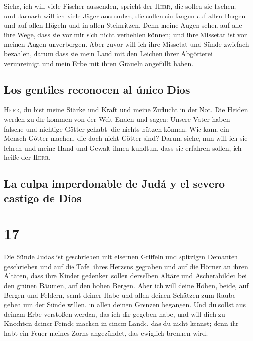  Siehe, ich will viele Fischer aussenden, spricht der
\textsc{Herr}, die sollen sie fischen; und darnach will ich viele Jäger
aussenden, die sollen sie fangen auf allen Bergen und auf allen Hügeln
und in allen Steinritzen.  Denn meine Augen sehen auf
alle ihre Wege, dass sie vor mir sich nicht verhehlen können; und ihre
Missetat ist vor meinen Augen unverborgen.  Aber zuvor
will ich ihre Missetat und Sünde zwiefach bezahlen, darum dass sie mein
Land mit den Leichen ihrer Abgötterei verunreinigt und mein Erbe mit
ihren Gräueln angefüllt haben.

\hypertarget{los-gentiles-reconocen-al-uxfanico-dios}{%
\subsection{Los gentiles reconocen al único
Dios}\label{los-gentiles-reconocen-al-uxfanico-dios}}

 \textsc{Herr}, du bist meine Stärke und Kraft und meine
Zuflucht in der Not. Die Heiden werden zu dir kommen von der Welt Enden
und sagen: Unsere Väter haben falsche und nichtige Götter gehabt, die
nichts nützen können.  Wie kann ein Mensch Götter machen,
die doch nicht Götter sind?  Darum siehe, nun will ich
sie lehren und meine Hand und Gewalt ihnen kundtun, dass sie erfahren
sollen, ich heiße der \textsc{Herr}.

\hypertarget{la-culpa-imperdonable-de-juduxe1-y-el-severo-castigo-de-dios}{%
\subsection{La culpa imperdonable de Judá y el severo castigo de
Dios}\label{la-culpa-imperdonable-de-juduxe1-y-el-severo-castigo-de-dios}}

\hypertarget{section-16}{%
\section{17}\label{section-16}}

 Die Sünde Judas ist geschrieben mit eisernen Griffeln und
spitzigen Demanten geschrieben und auf die Tafel ihres Herzens gegraben
und auf die Hörner an ihren Altären,  dass ihre Kinder
gedenken sollen derselben Altäre und Ascherabilder bei den grünen
Bäumen, auf den hohen Bergen.  Aber ich will deine Höhen,
beide, auf Bergen und Feldern, samt deiner Habe und allen deinen
Schätzen zum Raube geben um der Sünde willen, in allen deinen Grenzen
begangen.  Und du sollst aus deinem Erbe verstoßen werden,
das ich dir gegeben habe, und will dich zu Knechten deiner Feinde machen
in einem Lande, das du nicht kennst; denn ihr habt ein Feuer meines
Zorns angezündet, das ewiglich brennen wird.

